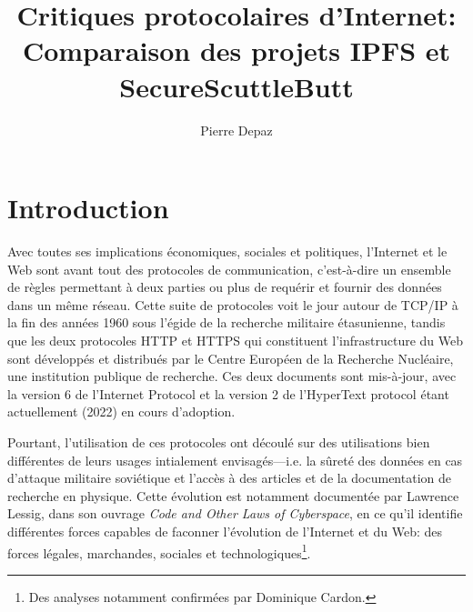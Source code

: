 \documentclass{article}
\begin{document}
\title{Critiques protocolaires d'Internet: Comparaison des projets IPFS et SecureScuttleButt}
\author{Pierre Depaz}
\maketitle

\section{Introduction}

Avec toutes ses implications économiques, sociales et politiques, l'Internet et le Web\cite{fielding_hypertext_2014} sont avant tout des protocoles de communication, c'est-à-dire un ensemble de règles permettant à deux parties ou plus de requérir et fournir des données dans un même réseau. Cette suite de protocoles voit le jour autour de TCP/IP à la fin des années 1960 sous l'égide de la recherche militaire étasunienne, tandis que les deux protocoles HTTP et HTTPS qui constituent l'infrastructure du Web sont développés et distribués par le Centre Européen de la Recherche Nucléaire, une institution publique de recherche. Ces deux documents sont mis-à-jour, avec la version 6 de l'Internet Protocol et la version 2 de l'HyperText protocol étant actuellement (2022) en cours d'adoption.

Pourtant, l'utilisation de ces protocoles ont découlé sur des utilisations bien différentes de leurs usages intialement envisagés—i.e. la sûreté des données en cas d'attaque militaire soviétique et l'accès à des articles et de la documentation de recherche en physique. Cette évolution est notamment documentée par Lawrence Lessig, dans son ouvrage \emph{Code and Other Laws of Cyberspace}\cite{lessig_code_1999}, en ce qu'il identifie différentes forces capables de faconner l'évolution de l'Internet et du Web: des forces légales, marchandes, sociales et technologiques\footnote{Des analyses notamment confirmées par Dominique Cardon\cite{cardon_culture_2019}.}.
\end{document}

